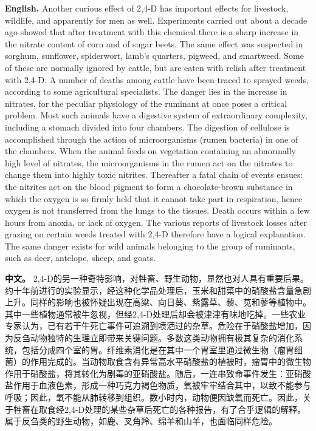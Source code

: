 \noindent\textbf{English.} Another curious effect of 2,4-D has important effects for livestock, wildlife, and apparently for men as well. Experiments carried out about a decade ago showed that after treatment with this chemical there is a sharp increase in the nitrate content of corn and of sugar beets. The same effect was suspected in sorghum, sunflower, spiderwort, lamb's quarters, pigweed, and smartweed. Some of these are normally ignored by cattle, but are eaten with relish after treatment with 2,4-D. A number of deaths among cattle have been traced to sprayed weeds, according to some agricultural specialists. The danger lies in the increase in nitrates, for the peculiar physiology of the ruminant at once poses a critical problem. Most such animals have a digestive system of extraordinary complexity, including a stomach divided into four chambers. The digestion of cellulose is accomplished through the action of microorganisms (rumen bacteria) in one of the chambers. When the animal feeds on vegetation containing an abnormally high level of nitrates, the microorganisms in the rumen act on the nitrates to change them into highly toxic nitrites. Thereafter a fatal chain of events ensues: the nitrites act on the blood pigment to form a chocolate-brown substance in which the oxygen is so firmly held that it cannot take part in respiration, hence oxygen is not transferred from the lungs to the tissues. Death occurs within a few hours from anoxia, or lack of oxygen. The various reports of livestock losses after grazing on certain weeds treated with 2,4-D therefore have a logical explanation. The same danger exists for wild animals belonging to the group of ruminants, such as deer, antelope, sheep, and goats.
\par
\noindent\textbf{中文。} 2,4-D的另一种奇特影响，对牲畜、野生动物，显然也对人具有重要后果。约十年前进行的实验显示，经这种化学品处理后，玉米和甜菜中的硝酸盐含量急剧上升。同样的影响也被怀疑出现在高粱、向日葵、紫露草、藜、苋和蓼等植物中。其中一些植物通常被牛忽视，但经2,4-D处理后却会被津津有味地吃掉。一些农业专家认为，已有若干牛死亡事件可追溯到喷洒过的杂草。危险在于硝酸盐增加，因为反刍动物独特的生理立即带来关键问题。多数这类动物拥有极其复杂的消化系统，包括分成四个室的胃。纤维素消化是在其中一个胃室里通过微生物（瘤胃细菌）的作用完成的。当动物取食含有异常高水平硝酸盐的植被时，瘤胃中的微生物作用于硝酸盐，将其转化为剧毒的亚硝酸盐。随后，一连串致命事件发生：亚硝酸盐作用于血液色素，形成一种巧克力褐色物质，氧被牢牢结合其中，以致不能参与呼吸；因此，氧不能从肺转移到组织。数小时内，动物便因缺氧而死亡。因此，关于牲畜在取食经2,4-D处理的某些杂草后死亡的各种报告，有了合乎逻辑的解释。属于反刍类的野生动物，如鹿、叉角羚、绵羊和山羊，也面临同样危险。
\par\medskip

